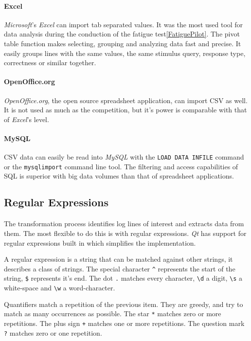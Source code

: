 \paragraph{Excel}
\textit{Microsoft}'s \textit{Excel} can import tab separated values.
It was the most used tool for data analysis during the conduction of the fatigue test\ref{FatiguePilot}.
The pivot table function makes selecting, grouping and analyzing data fast and precise.
It easily groups lines with the same values, the same stimulus query, response type, correctness or similar together.

\paragraph{OpenOffice.org}
\textit{OpenOffice.org}, the open source spreadsheet application, can import CSV as well.
It is not used as much as the competition, but it's power is comparable with that of \textit{Excel}'s level.

\paragraph{MySQL}
CSV data can easily be read into \textit{MySQL} with the \texttt{LOAD DATA INFILE} command or the \texttt{mysqlimport} command line tool.
The filtering and access capabilities of SQL is superior with big data volumes than that of spreadsheet applications.


\subsection{Regular Expressions}
\paragraph{}
The transformation process identifies log lines of interest and extracts data from them.
The most flexible to do this is with regular expressions.
\textit{Qt} has support for regular expressions built in which simplifies the implementation.

A regular expression is a string that can be matched against other strings, it describes a class of strings.
The special character \texttt{\^} represents the start of the string, \texttt{\$} represents it's end.
The dot \texttt{.} matches every character, \texttt{\textbackslash d} a digit, \texttt{\textbackslash s} a white-space and \texttt{\textbackslash w} a word-character.

Quantifiers match a repetition of the previous item.
They are greedy, and try to match as many occurrences as possible.
The star \texttt{*} matches zero or more repetitions.
The plus sign \texttt{+} matches one or more repetitions.
The question mark \texttt{?} matches zero or one repetition.

